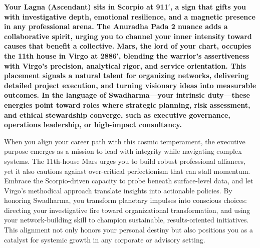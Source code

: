 {\fontsize{9.5}{13.8}\selectfont\bfseries\color{DeepSlate} Your Lagna (Ascendant) sits in Scorpio at 9\textdegree{}11′, a sign that gifts you with investigative depth, emotional resilience, and a magnetic presence in any professional arena. The Anuradha Pada 2 nuance adds a collaborative spirit, urging you to channel your inner intensity toward causes that benefit a collective. Mars, the lord of your chart, occupies the 11th house in Virgo at 28\textdegree{}86′, blending the warrior's assertiveness with Virgo's precision, analytical rigor, and service orientation. This placement signals a natural talent for organizing networks, delivering detailed project execution, and turning visionary ideas into measurable outcomes. In the language of Swadharma---your intrinsic duty---these energies point toward roles where strategic planning, risk assessment, and ethical stewardship converge, such as executive governance, operations leadership, or high-impact consultancy.}\par\vspace{2mm}

{\fontsize{9}{13}\selectfont When you align your career path with this cosmic temperament, the executive purpose emerges as a mission to lead with integrity while navigating complex systems. The 11th-house Mars urges you to build robust professional alliances, yet it also cautions against over-critical perfectionism that can stall momentum. Embrace the Scorpio-driven capacity to probe beneath surface-level data, and let Virgo's methodical approach translate insights into actionable policies. By honoring Swadharma, you transform planetary impulses into conscious choices: directing your investigative fire toward organizational transformation, and using your network-building skill to champion sustainable, results-oriented initiatives. This alignment not only honors your personal destiny but also positions you as a catalyst for systemic growth in any corporate or advisory setting.}\par\vspace{1.8mm}


